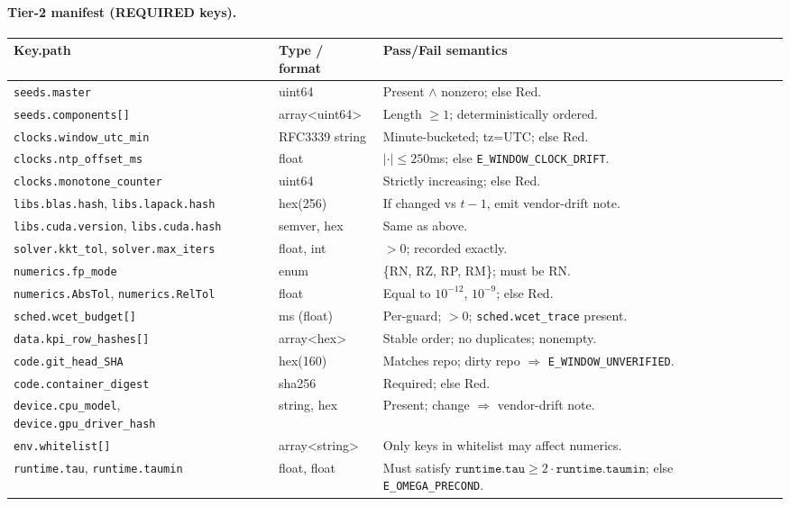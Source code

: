 \documentclass[10pt]{article}
\providecommand{\AbsTol}{10^{-12}}
\providecommand{\RelTol}{10^{-9}}
\begin{document}
\paragraph{Tier-2 manifest (REQUIRED keys).}
\begin{center}
\renewcommand{\arraystretch}{1.12}
\begin{tabularx}{\textwidth}{@{} l l X @{}}
\toprule
\textbf{Key.path} & \textbf{Type / format} & \textbf{Pass/Fail semantics} \\
\midrule
\texttt{seeds.master} & uint64 & Present $\land$ nonzero; else \textsf{Red}. \\
\texttt{seeds.components[\*]} & array<uint64> & Length $\ge1$; deterministically ordered. \\
\texttt{clocks.window\_utc\_min} & RFC3339 string & Minute-bucketed; tz=UTC; else \textsf{Red}. \\
\texttt{clocks.ntp\_offset\_ms} & float & $|\cdot|\le250$ms; else \texttt{E\_WINDOW\_CLOCK\_DRIFT}. \\
\texttt{clocks.monotone\_counter} & uint64 & Strictly increasing; else \textsf{Red}. \\
\texttt{libs.blas.hash}, \texttt{libs.lapack.hash} & hex(256) & If changed vs $t{-}1$, emit vendor-drift note. \\
\texttt{libs.cuda.version}, \texttt{libs.cuda.hash} & semver, hex & Same as above. \\
\texttt{solver.kkt\_tol}, \texttt{solver.max\_iters} & float, int & $>0$; recorded exactly. \\
\texttt{numerics.fp\_mode} & enum & \{RN, RZ, RP, RM\}; must be RN. \\
\texttt{numerics.AbsTol}, \texttt{numerics.RelTol} & float & Equal to $\AbsTol$, $\RelTol$; else \textsf{Red}. \\
\texttt{sched.wcet\_budget[\*]} & ms (float) & Per-guard; $>$0; \texttt{sched.wcet\_trace} present. \\
\texttt{data.kpi\_row\_hashes[\*]} & array<hex> & Stable order; no duplicates; nonempty. \\
\texttt{code.git\_head\_SHA} & hex(160) & Matches repo; dirty repo $\Rightarrow$ \texttt{E\_WINDOW\_UNVERIFIED}. \\
\texttt{code.container\_digest} & sha256 & Required; else \textsf{Red}. \\
\texttt{device.cpu\_model}, \texttt{device.gpu\_driver\_hash} & string, hex & Present; change $\Rightarrow$ vendor-drift note. \\
\texttt{env.whitelist[\*]} & array<string> & Only keys in whitelist may affect numerics. \\
\texttt{runtime.tau}, \texttt{runtime.taumin} & float, float & Must satisfy $\texttt{runtime.tau}\ge 2\cdot\texttt{runtime.taumin}$; else \texttt{E\_OMEGA\_PRECOND}. \\
\bottomrule
\end{tabularx}
\end{center}
\end{document}

